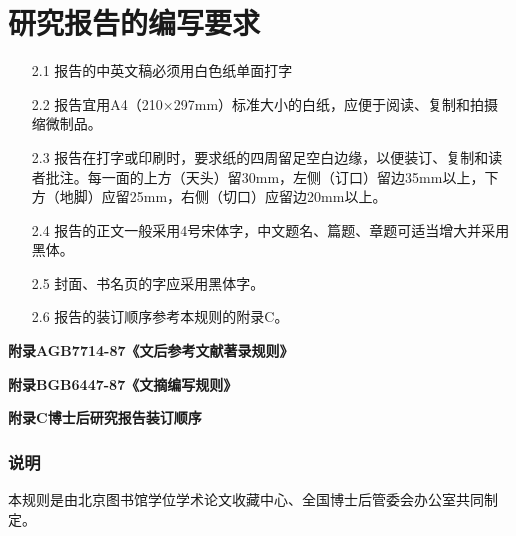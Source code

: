 \section{研究报告的编写要求}

\begin{itemize}[leftmargin=2em]
    \item[2.1] 报告的中英文稿必须用白色纸单面打字
    \item[2.2] 报告宜用A4（210×297mm）标准大小的白纸，应便于阅读、复制和拍摄缩微制品。
    \item[2.3] 报告在打字或印刷时，要求纸的四周留足空白边缘，以便装订、复制和读者批注。每一面的上方（天头）留30mm，左侧（订口）留边35mm以上，下方（地脚）应留25mm，右侧（切口）应留边20mm以上。
    \item[2.4] 报告的正文一般采用4号宋体字，中文题名、篇题、章题可适当增大并采用黑体。
    \item[2.5] 封面、书名页的字应采用黑体字。
    \item[2.6] 报告的装订顺序参考本规则的附录C。
\end{itemize}

\vspace{2em}

\begin{center}
    \textbf{附录A\quad GB7714-87《文后参考文献著录规则》}

    \textbf{附录B\quad GB6447-87《文摘编写规则》}

    \textbf{附录C\quad 博士后研究报告装订顺序}
\end{center}

\vspace{1em}

\subsubsection*{说明}
\noindent
本规则是由北京图书馆学位学术论文收藏中心、全国博士后管委会办公室共同制定。
\endgroup



\endinput
